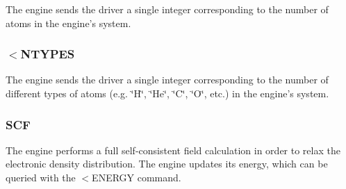 The engine sends the driver a single integer corresponding to the number of atoms in the engine's system.\hypertarget{index_recv_types}{}\subsubsection{$<$\-N\-T\-Y\-P\-E\-S}\label{index_recv_types}
The engine sends the driver a single integer corresponding to the number of different types of atoms (e.\-g. \char`\"{}\-H\char`\"{}, \char`\"{}\-He\char`\"{}, \char`\"{}\-C\char`\"{}, \char`\"{}\-O\char`\"{}, etc.) in the engine's system.\hypertarget{index_scf_command}{}\subsubsection{S\-C\-F}\label{index_scf_command}
The engine performs a full self-\/consistent field calculation in order to relax the electronic density distribution. The engine updates its energy, which can be queried with the {\ttfamily $<$E\-N\-E\-R\-G\-Y} command. 